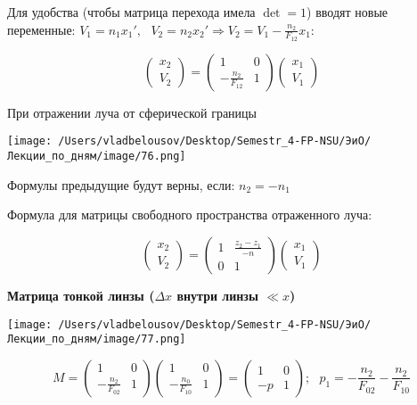 \documentclass[12pt, a4paper]{report}
\begin{document}
Для удобства (чтобы матрица перехода имела \( \det =1 \)) вводят новые переменные: \( \displaystyle V_1 = n_1 x_1 ' , \text{ }  V_2 = n_2 x_2 '   \Rightarrow V_2 = V_1 - \frac{n_2 }{F_{12} } x_1  \):

\[ \begin{pmatrix}
x_2     \\
V_2
\end{pmatrix} = \begin{pmatrix}
1  & 0 \\
-\frac{n_2}{F_{12} }  & 1 
\end{pmatrix} \begin{pmatrix}
x_1     \\
V_1 
\end{pmatrix} \] 

При отражении луча от сферической границы

\begin{center}
    \texttt{[image: /Users/vladbelousov/Desktop/Semestr\_4-FP-NSU/ЭиО/Лекции\_по\_дням/image/76.png]}
\end{center} 

Формулы предыдущие будут верны, если: \(n_2 = -n_1   \) 

Формула для матрицы свободного пространства отраженного луча: 

\[ \begin{pmatrix}
x_2     \\
V_2
\end{pmatrix} = \begin{pmatrix}
1  & \frac{z_2 - z_1 }{-n }  \\
0  & 1 
\end{pmatrix} \begin{pmatrix}
x_1     \\
V_1 
\end{pmatrix} \]

\textbf{Матрица тонкой линзы (\(  \Delta x\) внутри линзы \( \ll x \))} 

\begin{center}
    \texttt{[image: /Users/vladbelousov/Desktop/Semestr\_4-FP-NSU/ЭиО/Лекции\_по\_дням/image/77.png]}
\end{center} 

\[ M= \begin{pmatrix}
    1  & 0  \\
    - \frac{n_2}{F_{02}}   & 1 
    \end{pmatrix}
    \begin{pmatrix}
        1  & 0  \\
        - \frac{n_0}{F_{10}}   & 1 
    \end{pmatrix} = \begin{pmatrix}
        1  & 0  \\
       - p    & 1 
    \end{pmatrix} ; \text{ }  p_1 = - \frac{n_2}{F_{02} } - \frac{n_2}{F_{10}}   \] 
\end{document}
